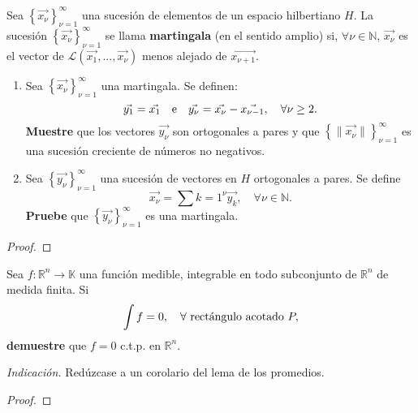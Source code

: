\documentclass[12pt]{report}
\theoremstyle{largebreak}
\newcommand\cf[3]{\ensuremath{#1:#2\rightarrow#3}}
\newcommand\norm[1]{\ensuremath{\|#1\|}}
\begin{document}
    \begin{excer}
        Sea $\left\{\vec{x_\nu} \right\}_{\nu=1}^\infty$ una sucesión de elementos de un espacio hilbertiano $H$. La sucesión $\left\{\vec{x_\nu} \right\}_{\nu=1}^\infty$ se llama \textbf{martingala} (en el sentido amplio) si, $\forall\nu\in\mathbb{N}$, $\vec{x_\nu}$ es el vector de $\mathcal{L}(\vec{x_1},...,\vec{x_\nu})$ menos alejado de $\vec{x_{\nu+1}}$.
        \begin{enumerate}
            \item Sea $\left\{\vec{x_\nu} \right\}_{\nu=1}^\infty$ una martingala. Se definen:
            \begin{equation*}
                \vec{y_1}=\vec{x_1}\quad\textup{e}\quad\vec{y_\nu}=\vec{x_\nu}-\vec{x_{\nu-1}},\quad\forall\nu\geq2.
            \end{equation*}
            \textbf{Muestre} que los vectores $\vec{y_\nu}$ son ortogonales a pares y que $\left\{\norm{\vec{x_\nu}} \right\}_{\nu=1}^\infty$ es una sucesión creciente de números no negativos.
            \item Sea $\left\{\vec{y_\nu} \right\}_{\nu=1}^\infty$ una sucesión de vectores en $H$ ortogonales a pares. Se define
            \begin{equation*}
                \vec{x_\nu}=\sum{k=1}^\nu\vec{y_k},\quad\forall\nu\in\mathbb{N}.
            \end{equation*}
            \textbf{Pruebe} que $\left\{\vec{y_\nu} \right\}_{\nu=1}^\infty$ es una martingala.
        \end{enumerate}
    \end{excer}

    \begin{proof}
        
    \end{proof}

    \begin{excer}
        Sea $\cf{f}{\mathbb{R}^n}{\mathbb{K}}$ una función medible, integrable en todo subconjunto de $\mathbb{R}^n$ de medida finita. Si
        \begin{equation*}
            \int f=0,\quad\forall\textup{ rectángulo acotado }P,
        \end{equation*}
        \textbf{demuestre} que $f=0$ c.t.p. en $\mathbb{R}^n$.
        
        \textit{Indicación.} Redúzcase a un corolario del lema de los promedios.
    \end{excer}

    \begin{proof}
        
    \end{proof}
\end{document}
